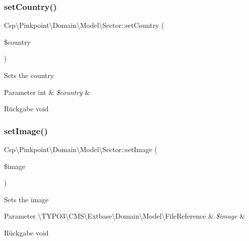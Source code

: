 \subsubsection{\texorpdfstring{set\+Country()}{setCountry()}}
{\footnotesize\ttfamily Csp\textbackslash{}\+Pinkpoint\textbackslash{}\+Domain\textbackslash{}\+Model\textbackslash{}\+Sector\+::set\+Country (\begin{DoxyParamCaption}\item[{}]{\$country }\end{DoxyParamCaption})}

Sets the country


\begin{DoxyParams}[1]{Parameter}
int & {\em \$country} & \\
\hline
\end{DoxyParams}
\begin{DoxyReturn}{Rückgabe}
void 
\end{DoxyReturn}
\mbox{\label{classCsp_1_1Pinkpoint_1_1Domain_1_1Model_1_1Sector_a813ad1e71b62046d2b88b71b156b45ba}} 
\subsubsection{\texorpdfstring{set\+Image()}{setImage()}}
{\footnotesize\ttfamily Csp\textbackslash{}\+Pinkpoint\textbackslash{}\+Domain\textbackslash{}\+Model\textbackslash{}\+Sector\+::set\+Image (\begin{DoxyParamCaption}\item[{\textbackslash{}T\+Y\+P\+O3\textbackslash{}\+C\+M\+S\textbackslash{}\+Extbase\textbackslash{}\+Domain\textbackslash{}\+Model\textbackslash{}\+File\+Reference}]{\$image }\end{DoxyParamCaption})}

Sets the image


\begin{DoxyParams}[1]{Parameter}
\textbackslash{}\+T\+Y\+P\+O3\textbackslash{}\+C\+M\+S\textbackslash{}\+Extbase\textbackslash{}\+Domain\textbackslash{}\+Model\textbackslash{}\+File\+Reference & {\em \$image} & \\
\hline
\end{DoxyParams}
\begin{DoxyReturn}{Rückgabe}
void 
\end{DoxyReturn}
\mbox{\label{classCsp_1_1Pinkpoint_1_1Domain_1_1Model_1_1Sector_ad6d2cf28223ccd7ccf04662c5530f2a2}} 
